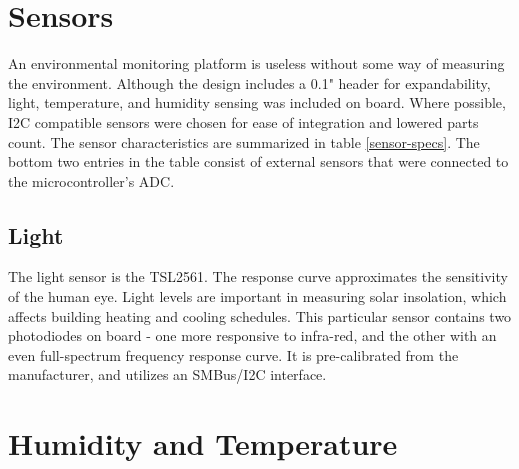 \section{Sensors}

An environmental monitoring platform is useless without some way of measuring the environment. Although the design includes a 0.1" header for expandability, light, temperature, and humidity sensing was included on board. Where possible, I2C compatible sensors were chosen for ease of integration and lowered parts count. The sensor characteristics are summarized in table \ref{sensor-specs}. The bottom two entries in the table consist of external sensors that were connected to the microcontroller's ADC. 

\begin{table}[h]
\caption{Sensor specifications}
\label{sensor-specs}
\end{table}

\subsection{Light}

The light sensor is the TSL2561. The response curve approximates the sensitivity of the human eye. Light levels are important in measuring solar insolation, which affects building heating and cooling schedules. This particular sensor contains two photodiodes on board - one more responsive to infra-red, and the other with an even full-spectrum frequency response curve. It is pre-calibrated from the manufacturer, and utilizes an SMBus/I2C interface.

\section{Humidity and Temperature}

